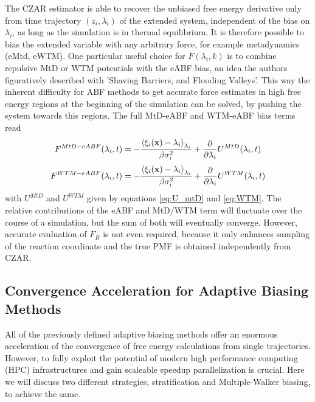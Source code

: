 The CZAR estimator is able to recover the unbiased free energy derivative only from time trajectory $(z_i,\lambda_i)$ of the extended system, independent of the bias on $\lambda_i$, as long as the simulation is in thermal equilibrium. It is therefore possible to bias the extended variable with any arbitrary force, for example metadynamics (eMtd, eWTM).
One particular useful choice for $\overline{F}(\lambda_{i}, k)$ is to combine repulsive MtD or WTM potentials with the eABF bias, an idea the authors figuratively described with 'Shaving Barriers, and Flooding Valleys'.\autocite{fu2018zooming}
This way the inherent difficulty for ABF methods to get accurate force estimates in high free energy regions at the beginning of the simulation can be solved, by pushing the system towards this regions.
The full MtD-eABF and WTM-eABF bias terms read
\begin{equation}
  F^{MtD-eABF}(\lambda_i, t) = -\frac{\braket{\xi_i(\textbf{x})-\lambda_i}_{\lambda_i}}{\beta \sigma_i^2}+\frac{\partial}{\partial \lambda_i} U^{MtD}(\lambda_i,t)
\end{equation}
\begin{equation}
  F^{WTM-eABF}(\lambda_i, t) = -\frac{\braket{\xi_i(\textbf{x})-\lambda_i}_{\lambda_i}}{\beta \sigma_i^2}+\frac{\partial}{\partial \lambda_i} U^{WTM}(\lambda_i,t)
\end{equation}
with $U^{MtD}$ and $U^{WTM}$ given by equations \ref{eq:U_mtD} and \ref{eq:WTM}.
The relative contributions of the eABF and MtD/WTM term will fluctuate over the course of a simulation, but the sum of both will eventually converge. However, accurate evaluation of $F_B$ is not even required, because it only enhances sampling of the reaction coordinate and the true PMF is obtained independently from CZAR.

\newpage
\subsection{Convergence Acceleration for Adaptive Biasing Methods}
\label{sec:MW}
All of the previously defined adaptive biasing methods offer an enormous acceleration of the convergence of free energy calculations from single trajectories.
However, to fully exploit the potential of modern high performance computing (HPC) infrastructures and gain scaleable speedup parallelization is crucial.
Here we will discuss two different strategies, stratification and Multiple-Walker biasing, to achieve the same.


